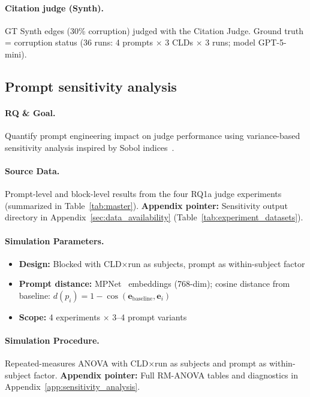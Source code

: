 \paragraph{Citation judge (Synth).}\label{sec:rq1a_citation_synth}
GT Synth edges (30\% corruption) judged with the Citation Judge. Ground truth = corruption status (36 runs: 4 prompts $\times$ 3 CLDs $\times$ 3 runs; model GPT-5-mini).

\subsection{Prompt sensitivity analysis}
\label{sec:rq1a_sensitivity}

\paragraph{RQ \& Goal.}
Quantify prompt engineering impact on judge performance using variance-based sensitivity analysis inspired by Sobol indices~\cite{sobol1993sensitivity}.

\paragraph{Source Data.}
Prompt-level and block-level results from the four RQ1a judge experiments (summarized in Table~\ref{tab:master}).
\textbf{Appendix pointer:} Sensitivity output directory in Appendix~\ref{sec:data_availability} (Table~\ref{tab:experiment_datasets}).

\paragraph{Simulation Parameters.}
\begin{itemize}[noitemsep]
    \item \textbf{Design:} Blocked with CLD$\times$run as subjects, prompt as within-subject factor
    \item \textbf{Prompt distance:} MPNet~\cite{song2020mpnet} embeddings (768-dim); cosine distance from baseline: $d(p_i) = 1 - \cos(\mathbf{e}_{\text{baseline}}, \mathbf{e}_i)$
    \item \textbf{Scope:} 4 experiments $\times$ 3--4 prompt variants
\end{itemize}

\paragraph{Simulation Procedure.}
Repeated-measures ANOVA with CLD$\times$run as subjects and prompt as within-subject factor.
\textbf{Appendix pointer:} Full RM-ANOVA tables and diagnostics in Appendix~\ref{app:sensitivity_analysis}.

